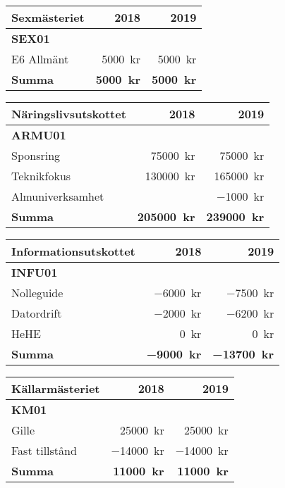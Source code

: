 \documentclass[10pt]{article}
\begin{document}
    \begin{tabularx}{10cm}{X r r}
        \textbf{\large Sexmästeriet} & \textbf{2018} & \textbf{2019} \\
        \hline
        \textbf{SEX01} \\
        E6 Allmänt & \SI{5000}{kr} & \SI{5000}{kr} \\
        \hline
        \textbf{Summa} & \textbf{\SI{5000}{kr}} & \textbf{\SI{5000}{kr}} \\
    \end{tabularx}
    
    \begin{tabularx}{10cm}{X r r}
        \textbf{\large Näringslivsutskottet} & \textbf{2018} & \textbf{2019} \\
        \hline
        \textbf{ARMU01} \\
        Sponsring & \SI{75000}{kr} & \SI{75000}{kr} \\
        Teknikfokus & \SI{130000}{kr} & \SI{165000}{kr} \\
        Almuniverksamhet &  & \SI{-1000}{kr} \\
        \hline
        \textbf{Summa} & \textbf{\SI{205000}{kr}} & \textbf{\SI{239000}{kr}} \\
    \end{tabularx}
    
    \begin{tabularx}{10cm}{X r r}
        \textbf{\large Informationsutskottet} & \textbf{2018} & \textbf{2019} \\
        \hline
        \textbf{INFU01} \\
        Nolleguide & \SI{-6000}{kr} & \SI{-7500}{kr} \\
        Datordrift & \SI{-2000}{kr} & \SI{-6200}{kr} \\
        HeHE & \SI{0}{kr} & \SI{0}{kr} \\
        \hline
        \textbf{Summa} & \textbf{\SI{-9000}{kr}} & \textbf{\SI{-13700}{kr}} \\
    \end{tabularx}
    
    \begin{tabularx}{10cm}{X r r}
        \textbf{\large Källarmästeriet} & \textbf{2018} & \textbf{2019} \\
        \hline
        \textbf{KM01} \\
        Gille & \SI{25000}{kr} & \SI{25000}{kr} \\
        Fast tillstånd & \SI{-14000}{kr} & \SI{-14000}{kr} \\
        \hline
        \textbf{Summa} & \textbf{\SI{11000}{kr}} & \textbf{\SI{11000}{kr}} \\
    \end{tabularx}
    
\end{document}
